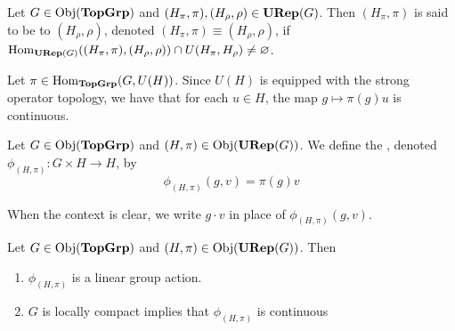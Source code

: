 \documentclass{book}
\begin{document}
	\begin{defn}
		Let $G \in \operatorname{Obj}(\operatorname*{\text{\textbf{TopGrp}}})$ and $(H_{\pi}, \pi), (H_{\rho}, \rho) \in \operatorname*{\text{\textbf{URep}}}(G)$. Then $(H_{\pi}, \pi)$ is said to be  to $(H_{\rho}, \rho)$, denoted $(H_{\pi}, \pi) \equiv (H_{\rho}, \rho)$, if $\operatorname{Hom}_{\operatorname*{\text{\textbf{URep}}}(G)}((H_{\pi}, \pi), (H_{\rho}, \rho)) \cap U(H_{\pi}, H_{\rho}) \neq \varnothing$.
	\end{defn}
	
	\begin{note}
		Let $\pi \in \operatorname{Hom}_{\operatorname*{\text{\textbf{TopGrp}}}}(G, U(H))$. Since $U(H)$ is equipped with the strong operator topology, we have that for each $u \in H$, the map $g \mapsto \pi(g)u$ is continuous.  
	\end{note}
	
	\begin{defn}
		Let $G \in \operatorname{Obj}(\operatorname*{\text{\textbf{TopGrp}}})$ and $(H, \pi) \in \operatorname{Obj}(\operatorname*{\text{\textbf{URep}}}(G))$. We define the , denoted $\phi_{(H, \pi)}: G \times H \rightarrow H$, by 
		$$\phi_{(H, \pi)}(g, v) = \pi(g)v$$ 
	\end{defn}
	
	\begin{note}
		When the context is clear, we write $g \cdot v$ in place of $\phi_{(H, \pi)}(g, v)$. 
	\end{note}
	
	\begin{ex}
		Let $G \in \operatorname{Obj}(\operatorname*{\text{\textbf{TopGrp}}})$ and $(H, \pi) \in \operatorname{Obj}(\operatorname*{\text{\textbf{URep}}}(G))$. Then 
		\begin{enumerate}
			\item $\phi_{(H, \pi)}$ is a linear group action. 
			\item $G$ is locally compact implies that $\phi_{(H, \pi)}$ is continuous
		\end{enumerate}
	\end{ex}
	
\end{document}

